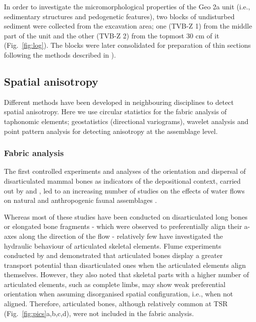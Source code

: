 \documentclass[review,times,authoryear]{elsarticle} %
\begin{document}
In order to investigate the micromorphological properties of the Geo 2a unit (i.e., sedimentary structures and pedogenetic features), two blocks of undisturbed sediment were collected from the excavation area; one (TVB-Z 1) from the middle part of the unit and the other (TVB-Z 2) from the topmost 30 cm of it (Fig.~\ref{fig:log}). The blocks were later consolidated for preparation of thin sections following the methods described in \citet{Murphy1986}).

\subsection{Spatial anisotropy}

Different methods have been developed in neighbouring disciplines to detect spatial anisotropy. Here we use circular statistics for the fabric analysis of taphonomic elements; geostatistics (directional variograms), wavelet analysis and point pattern analysis for detecting anisotropy at the assemblage level.

\subsubsection{Fabric analysis}

The first controlled experiments and analyses of the orientation and dispersal of disarticulated  mammal bones as indicators of the depositional context, carried out by \cite{Toots1965} and \cite{Voorhies1969}, led to an increasing number of studies on the effects of water flows on natural and anthropogenic faunal assemblages \citep[][among others]{Nash1987,Schick1987a,Petraglia1987,Petraglia1994,Fiorillo1991,Benito-Calvo2011,Torre2013a,Dominguez-Rodrigo2012,Dominguez-Rodrigo2014,Dominguez-Rodrigo2014c,Cobo-Sanchez2014,Aramendi2017,Organista2017}.

Whereas most of these studies have been conducted on disarticulated long bones or elongated bone fragments - which were observed to preferentially align their a-axes along the direction of the flow - relatively few have investigated the hydraulic behaviour of articulated skeletal elements. Flume experiments conducted by \cite{Coard1995} and \cite{Coard1999} demonstrated that articulated bones display a greater transport potential than disarticulated ones when the articulated elements align themselves. However, they also noted that skeletal parts with a higher number of articulated elements, such as complete limbs, may show weak preferential orientation when assuming disorganised spatial configuration, i.e., when not aligned. Therefore, articulated bones, although relatively common at TSR (Fig.~\ref{fig:pics}a,b,c,d), were not included in the fabric analysis.
\end{document}
